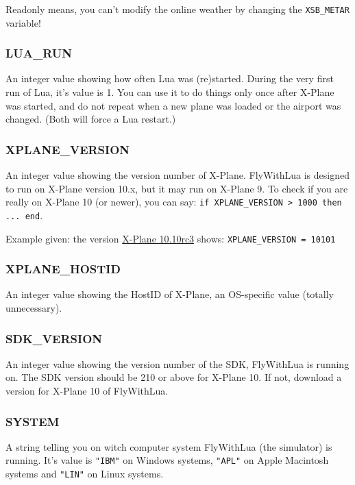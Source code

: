 \documentclass[11pt,parskip=half,a4paper]{scrartcl}
\begin{document}
Readonly means, you can't modify the online weather by changing the \verb|XSB_METAR| variable!

\subsubsection{LUA\_RUN}

An integer value showing how often Lua was (re)started. During the very first run of Lua, it's value is 1. You can use it to do things only once after X-Plane was started, and do not repeat when a new plane was loaded or the airport was changed. (Both will force a Lua restart.)

\subsubsection{XPLANE\_VERSION}

An integer value showing the version number of X-Plane. FlyWithLua is designed to run on X-Plane version 10.x, but it may run on X-Plane 9. To check if you are really on X-Plane 10 (or newer), you can say: \verb|if XPLANE_VERSION > 1000 then ... end|.

Example given: the version \href{http://wiki.x-plane.com/Beta#X-Plane_10.10_RC_3}{X-Plane 10.10rc3} shows: \verb|XPLANE_VERSION = 10101|

\subsubsection{XPLANE\_HOSTID}

An integer value showing the HostID of X-Plane, an OS-specific value (totally unnecessary).

\subsubsection{SDK\_VERSION}

An integer value showing the version number of the SDK, FlyWithLua is running on. The SDK version should be 210 or above for X-Plane 10. If not, download a version for X-Plane 10 of FlyWithLua.

\subsubsection{SYSTEM}

A string telling you on witch computer system FlyWithLua (the simulator) is running. It's value is \verb|"IBM"| on Windows systems, \verb|"APL"| on Apple Macintosh systems and \verb|"LIN"| on Linux systems.
\end{document}
